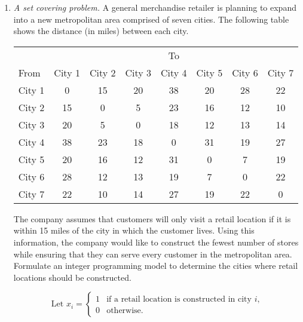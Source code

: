 \begin{enumerate}
\item \emph{A set covering problem.}  A general merchandise retailer
  is planning to expand into a new metropolitan area comprised of
  seven cities. The following table shows the distance (in miles)
  between each city.

\begin{center}
\begin{tabular}{l|ccccccc}
& \multicolumn{7}{c}{To} \\
From & City 1 & City 2 & City 3 & City 4 & City 5 & City 6 & City 7\\ \hline
City 1 & 0 & 15 & 20 & 38 & 20 & 28 & 22 \\
City 2 & 15 & 0 &  5 & 23 & 16 & 12 & 10 \\
City 3 & 20 & 5 & 0 & 18 & 12 & 13 & 14 \\
City 4 & 38 & 23 & 18 & 0 & 31 & 19 & 27 \\
City 5 & 20 & 16 & 12 & 31 & 0 & 7 & 19 \\
City 6 & 28 & 12 & 13 & 19 & 7 & 0 & 22 \\
City 7 & 22 & 10 & 14 & 27 & 19 & 22 & 0 \\
\end{tabular}
\end{center}

The company assumes that customers will only visit a retail location
if it is within 15 miles of the city in which the customer
lives. Using this information, the company would like to construct the
fewest number of stores while ensuring that they can serve every
customer in the metropolitan area. Formulate an integer programming
model to determine the cities where retail locations should be
constructed.

\begin{solution}
\bs
\begin{equation*}
\text{Let $x_i$} = 
\begin{cases}
  1 & \text{if a retail location is constructed in city $i$,}\\
  0 & \text{otherwise.}
\end{cases}
\end{equation*}


\end{solution}
\end{enumerate}
